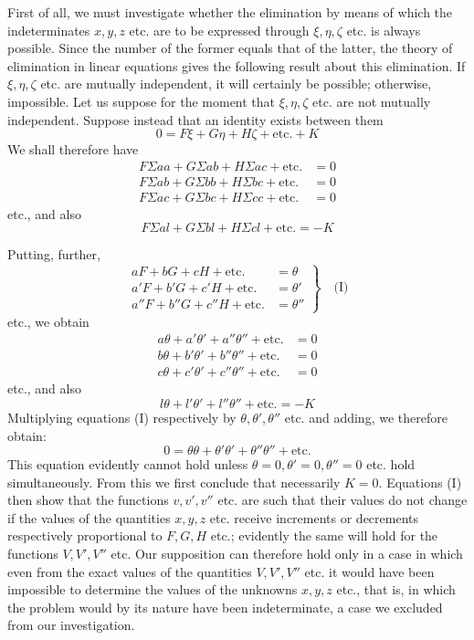 First of all, we must investigate whether the elimination by means of which the indeterminates \(x,y,z\) etc. are to be expressed through \(\xi,\eta,\zeta\) etc. is always possible. Since the number of the former equals that of the latter, the theory of elimination in linear equations gives the following result about this elimination. If \(\xi,\eta,\zeta\) etc. are mutually independent, it will certainly be possible; otherwise, impossible. Let us suppose for the moment that \(\xi,\eta,\zeta\) etc. are not mutually independent. Suppose instead that an identity exists between them
\[
0=F\xi+G\eta+H\zeta+\text{etc.}+K
\]
We shall therefore have
\[
\begin{aligned}
F\Sigma aa+G\Sigma ab+H\Sigma ac+\text{etc.}&=0\\
F\Sigma ab+G\Sigma bb+H\Sigma bc+\text{etc.}&=0\\
F\Sigma ac+G\Sigma bc+H\Sigma cc+\text{etc.}&=0
\end{aligned}
\]
etc., and also
\[
F\Sigma al+G\Sigma bl+H\Sigma cl+\text{etc.}=-K
\]
\par{}
Putting, further,
\[
\left.\begin{aligned}
aF+bG+cH+\text{etc.}&=\theta\\
a'F+b'G+c'H+\text{etc.}&=\theta'\\
a''F+b''G+c''H+\text{etc.}&=\theta''
\end{aligned}\right\}\quad\text{(I)}
\]
etc., we obtain
\[
\begin{aligned}
a\theta+a'\theta'+a''\theta''+\text{etc.}&=0\\
b\theta+b'\theta'+b''\theta''+\text{etc.}&=0\\
c\theta+c'\theta'+c''\theta''+\text{etc.}&=0
\end{aligned}
\]
etc., and also
\[
l\theta+l'\theta'+l''\theta''+\text{etc.}=-K
\]
Multiplying equations (I) respectively by \(\theta,\theta',\theta''\) etc. and adding, we therefore obtain:
\[
0=\theta\theta+\theta'\theta'+\theta''\theta''+\text{etc.}
\]
This equation evidently cannot hold unless \(\theta=0,\allowbreak\theta'=0,\allowbreak\theta''=0\) etc. hold simultaneously. From this we first conclude that necessarily \(K=0\). Equations (I) then show that the functions \(v,v',v''\) etc. are such that their values do not change if the values of the quantities \(x,y,z\) etc. receive increments or decrements respectively proportional to \(F,G,H\) etc.; evidently the same will hold for the functions \(V,V',V''\) etc. Our supposition can therefore hold only in a case in which even from the exact values of the quantities \(V,V',V''\) etc. it would have been impossible to determine the values of the unknowns \(x,y,z\) etc., that is, in which the problem would by its nature have been indeterminate, a case we excluded from our investigation.
